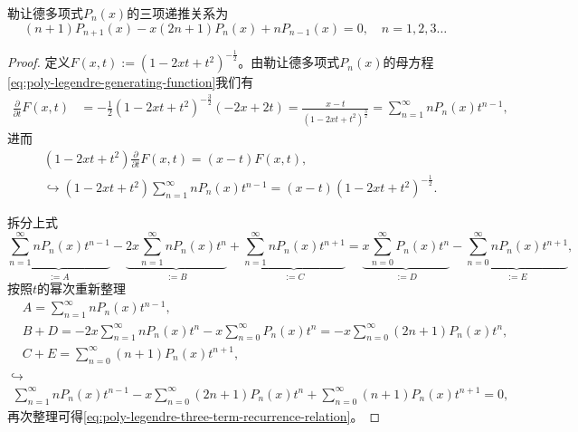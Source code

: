 \begin{subappendices}
\begin{theorem}[勒让德多项式的三项递推关系]
  勒让德多项式$P_n(x)$的三项递推关系为
  \begin{equation}
    \label{eq:poly-legendre-three-term-recurrence-relation}
    (n+1) P_{n+1}(x) - x(2n+1) P_n(x) + nP_{n-1}(x) =0, \quad n=1,2,3\ldots
  \end{equation}
\end{theorem}
\begin{proof}
  定义$F(x,t):= \left(1-2xt+t^2 \right)^{-\frac{1}{2}} $。由勒让德多项式$P_n(x)$的母方程\eqref{eq:poly-legendre-generating-function}我们有
  \begin{equation*}
    \label{eq:poly-legendre-partial-F-t}
      \begin{split}
        \frac{\partial }{\partial t}F(x,t) &= -\frac{1}{2} \left( 1-2xt+t^2 \right)^{-\frac{3}{2}} \left(-2x + 2t \right)
        = \frac{x-t}{\left( 1-2xt+t^2 \right)^{\frac{3}{2}}}
        =\sum_{n=1}^{\infty} n P_n(x) t^{n-1},
      \end{split}
  \end{equation*}
进而
\begin{equation*}
  \begin{split}
&\left(1-2xt+t^2 \right) \frac{\partial }{\partial t}F(x,t) = (x-t) F(x,t), \\
&\hookrightarrow \left(1-2xt+t^2 \right) \sum_{n=1}^{\infty} n P_n(x) t^{n-1} = (x-t) \left(1-2xt+t^2 \right)^{-\frac{1}{2}}.
  \end{split}
\end{equation*}

拆分上式
\begin{equation*}
  \underbrace{\sum_{n=1}^{\infty} n P_{n}(x) t^{n-1}}_{:=A}
  - \underbrace{2x \sum_{n=1}^{\infty} n P_n(x) t^n}_{:=B}
  + \underbrace{\sum_{n=1}^{\infty} n P_n(x) t^{n+1}}_{:=C}
  = \underbrace{x \sum_{n=0}^{\infty} P_n(x) t^n}_{:=D}
  - \underbrace{\sum_{n=0}^{\infty} n P_n(x) t^{n+1}}_{:=E},
\end{equation*}
按照$t$的幂次重新整理
\begin{equation*}
  \begin{split}
    &A = \sum_{n=1}^{\infty} n P_{n}(x) t^{n-1}, \\
    &B+D = -2x \sum_{n=1}^{\infty} n P_n(x) t^n  - x \sum_{n=0}^{\infty} P_n(x) t^n = -x \sum_{n=0}^{\infty} (2n+1) P_n(x) t^n, \\
    &C+E = \sum_{n=0}^{\infty} (n+1) P_n(x) t^{n+1},
  \end{split}
\end{equation*}
$\hookrightarrow$
\begin{equation*}
\begin{split}
  \sum_{n=1}^{\infty} n P_{n}(x) t^{n-1} -x \sum_{n=0}^{\infty} (2n+1) P_n(x) t^n + \sum_{n=0}^{\infty} (n+1) P_n(x) t^{n+1}=0,
\end{split}
\end{equation*}
再次整理可得\eqref{eq:poly-legendre-three-term-recurrence-relation}。
\end{proof}


\end{subappendices}
